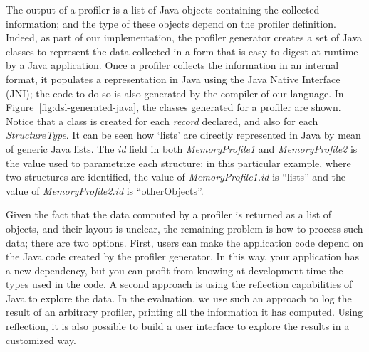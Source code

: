 The output of a profiler is a list of Java objects containing the collected information; and the type of these objects depend on the profiler definition.
Indeed, as part of our implementation, the profiler generator creates a set of Java classes to represent the data collected in a form that is easy to digest at runtime by a Java application.
Once a profiler collects the information in an internal format, it populates a representation in Java using the Java Native Interface (JNI); the code to do so is also generated by the compiler of our language.
In Figure~\ref{fig:dsl-generated-java}, the classes generated for a profiler are shown.
Notice that a class is created for each \textit{record} declared, and also for each \textit{StructureType}.
It can be seen how `lists' are directly represented in Java by mean of generic Java lists.
The \textit{id} field in both \textit{MemoryProfile1} and \textit{MemoryProfile2} is the value used to parametrize each structure;
in this particular example, where two structures are identified, the value of \textit{MemoryProfile1.id} is ``lists'' and the value of \textit{MemoryProfile2.id} is ``otherObjects''.

Given the fact that the data computed by a profiler is returned as a list of objects, and their layout is unclear, the remaining problem is how to process such data; there are two options.
First, users can make the application code depend on the Java code created by the profiler generator.
In this way, your application has a new dependency, but you can profit from knowing at development time the types used in the code.
A second approach is using the reflection capabilities of Java to explore the data.
In the evaluation, we use such an approach to log the result of an arbitrary profiler, printing all the information it has computed.
Using reflection, it is also possible to build a user interface to explore the results in a customized way.  


